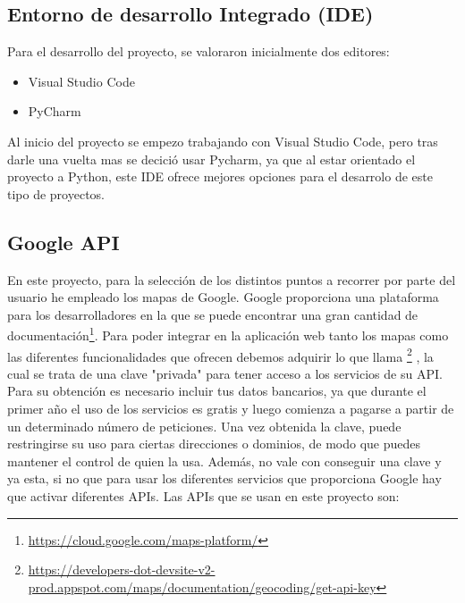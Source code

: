 \subsection{Entorno de desarrollo Integrado (IDE)}
Para el desarrollo del proyecto, se valoraron inicialmente dos editores:
\begin{itemize}
	\item Visual Studio Code
	\item PyCharm
\end{itemize}
Al inicio del proyecto se empezo trabajando con Visual Studio Code, pero tras darle una vuelta mas se decició usar Pycharm, ya que al estar orientado el proyecto a Python, este IDE ofrece mejores opciones para el desarrolo de este tipo de proyectos.


\subsection{Google API}
En este proyecto, para la selección de los distintos puntos a recorrer por parte del usuario he empleado los mapas de Google. Google proporciona una plataforma para los desarrolladores en la que se puede encontrar una gran cantidad de documentación\footnote{\url{https://cloud.google.com/maps-platform/}}.
Para poder integrar en la aplicación web tanto los mapas como las diferentes funcionalidades que ofrecen debemos adquirir lo que llama \footnote{\url{https://developers-dot-devsite-v2-prod.appspot.com/maps/documentation/geocoding/get-api-key}} , la cual se trata de una clave "privada" para tener acceso a los servicios de su API. Para su obtención es necesario incluir tus datos bancarios, ya que durante el primer año el uso de los servicios es gratis y luego comienza a pagarse a partir de un determinado número de peticiones.
Una vez obtenida la clave, puede restringirse su uso para ciertas direcciones o dominios, de modo que puedes mantener el control de quien la usa. Además, no vale con conseguir una clave y ya esta, si no que para usar los diferentes servicios que proporciona Google hay que activar diferentes APIs.
Las APIs que se usan en este proyecto son:
